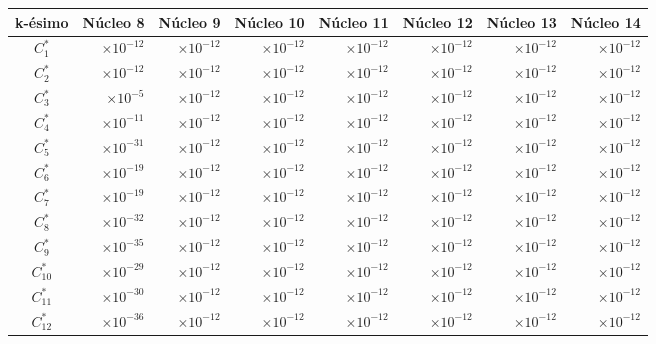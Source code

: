 \begin{center}
\begin{tabular}[h]{|c|r|r|r|r|r|r|r|}
    \hline
    k-ésimo & \multicolumn{1}{c|}{Núcleo 8} & \multicolumn{1}{c|}{Núcleo 9} & \multicolumn{1}{c|}{Núcleo 10} & \multicolumn{1}{c|}{Núcleo 11} & \multicolumn{1}{c|}{Núcleo 12} & \multicolumn{1}{c|}{Núcleo 13} & \multicolumn{1}{c|}{Núcleo 14} \\\hline\hline
    $C_1^*$ & $\times 10^{-12}$ & $\times 10^{-12}$ & $\times 10^{-12}$ & $\times 10^{-12}$ & $\times 10^{-12}$ & $\times 10^{-12}$ & $\times 10^{-12}$ \\
    $C_2^*$ & $\times 10^{-12}$& $\times 10^{-12}$ & $\times 10^{-12}$ & $\times 10^{-12}$ & $\times 10^{-12}$ & $\times 10^{-12}$ & $\times 10^{-12}$ \\
    $C_3^*$ & $\times 10^{-5}$& $\times 10^{-12}$ & $\times 10^{-12}$ & $\times 10^{-12}$ & $\times 10^{-12}$ & $\times 10^{-12}$ & $\times 10^{-12}$ \\
    $C_4^*$ & $\times 10^{-11}$& $\times 10^{-12}$ & $\times 10^{-12}$ & $\times 10^{-12}$ & $\times 10^{-12}$ & $\times 10^{-12}$ & $\times 10^{-12}$ \\
    $C_5^*$ & $\times 10^{-31}$& $\times 10^{-12}$ & $\times 10^{-12}$ & $\times 10^{-12}$ & $\times 10^{-12}$ & $\times 10^{-12}$ & $\times 10^{-12}$ \\
    $C_6^*$ & $\times 10^{-19}$& $\times 10^{-12}$ & $\times 10^{-12}$ & $\times 10^{-12}$ & $\times 10^{-12}$ & $\times 10^{-12}$ & $\times 10^{-12}$  \\
    $C_7^*$ & $\times 10^{-19}$& $\times 10^{-12}$ & $\times 10^{-12}$ & $\times 10^{-12}$ & $\times 10^{-12}$ & $\times 10^{-12}$ & $\times 10^{-12}$  \\
    $C_8^*$ & $\times 10^{-32}$& $\times 10^{-12}$ & $\times 10^{-12}$ & $\times 10^{-12}$ & $\times 10^{-12}$ & $\times 10^{-12}$ & $\times 10^{-12}$  \\
    $C_9^*$ &  $\times 10^{-35}$& $\times 10^{-12}$ & $\times 10^{-12}$ & $\times 10^{-12}$ & $\times 10^{-12}$ & $\times 10^{-12}$ & $\times 10^{-12}$ \\
    $C_{10}^*$ & $\times 10^{-29}$& $\times 10^{-12}$ & $\times 10^{-12}$ & $\times 10^{-12}$ & $\times 10^{-12}$ & $\times 10^{-12}$ & $\times 10^{-12}$ \\
    $C_{11}^*$ & $\times 10^{-30}$& $\times 10^{-12}$ & $\times 10^{-12}$ & $\times 10^{-12}$ & $\times 10^{-12}$ & $\times 10^{-12}$ & $\times 10^{-12}$  \\
    $C_{12}^*$ & $\times 10^{-36}$& $\times 10^{-12}$ & $\times 10^{-12}$ & $\times 10^{-12}$ & $\times 10^{-12}$ & $\times 10^{-12}$ & $\times 10^{-12}$  \\

\end{tabular}
\end{center}
